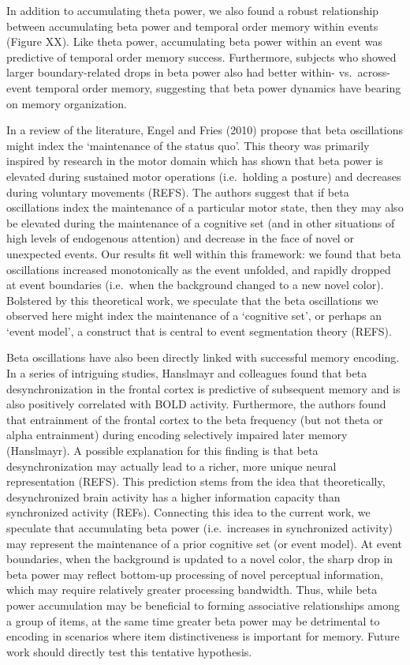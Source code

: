 In addition to accumulating theta power, we also found a robust
relationship between accumulating beta power and temporal order memory
within events (Figure XX). Like theta power, accumulating beta power
within an event was predictive of temporal order memory success.
Furthermore, subjects who showed larger boundary-related drops in beta
power also had better within- vs.~across-event temporal order memory,
suggesting that beta power dynamics have bearing on memory organization.

In a review of the literature, Engel and Fries (2010) propose that beta
oscillations might index the `maintenance of the status quo'. This
theory was primarily inspired by research in the motor domain which has
shown that beta power is elevated during sustained motor operations
(i.e.~holding a posture) and decreases during voluntary movements
(REFS). The authors suggest that if beta oscillations index the
maintenance of a particular motor state, then they may also be elevated
during the maintenance of a cognitive set (and in other situations of
high levels of endogenous attention) and decrease in the face of novel
or unexpected events. Our results fit well within this framework: we
found that beta oscillations increased monotonically as the event
unfolded, and rapidly dropped at event boundaries (i.e.~when the
background changed to a new novel color). Bolstered by this theoretical
work, we speculate that the beta oscillations we observed here might
index the maintenance of a `cognitive set', or perhaps an `event model',
a construct that is central to event segmentation theory (REFS).

Beta oscillations have also been directly linked with successful memory
encoding. In a series of intriguing studies, Hanslmayr and colleagues
found that beta desynchronization in the frontal cortex is predictive of
subsequent memory and is also positively correlated with BOLD activity.
Furthermore, the authors found that entrainment of the frontal cortex to
the beta frequency (but not theta or alpha entrainment) during encoding
selectively impaired later memory (Hanslmayr). A possible explanation
for this finding is that beta desynchronization may actually lead to a
richer, more unique neural representation (REFS). This prediction stems
from the idea that theoretically, desynchronized brain activity has a
higher information capacity than synchronized activity (REFs).
Connecting this idea to the current work, we speculate that accumulating
beta power (i.e.~increases in synchronized activity) may represent the
maintenance of a prior cognitive set (or event model). At event
boundaries, when the background is updated to a novel color, the sharp
drop in beta power may reflect bottom-up processing of novel perceptual
information, which may require relatively greater processing bandwidth.
Thus, while beta power accumulation may be beneficial to forming
associative relationships among a group of items, at the same time
greater beta power may be detrimental to encoding in scenarios where
item distinctiveness is important for memory. Future work should
directly test this tentative hypothesis.

